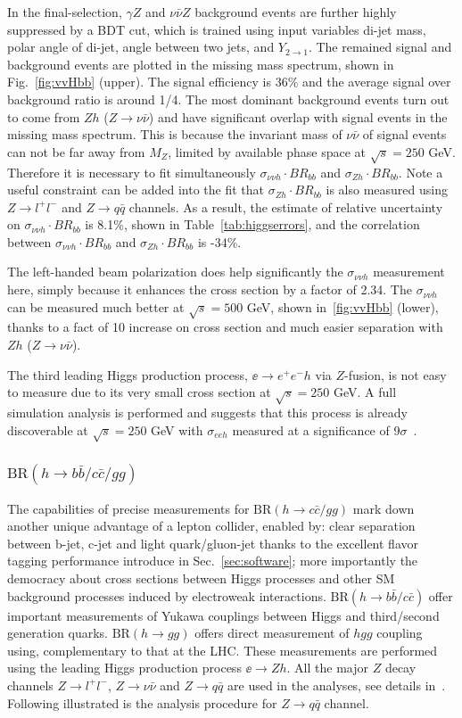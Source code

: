 In the final-selection, $\gamma Z$ and $\nu\bar{\nu}Z$ background 
events are further highly suppressed by a BDT cut, which is trained 
using input variables di-jet mass, polar angle of di-jet, angle between
two jets, and $Y_{2\to1}$. The remained signal and background events
are plotted in the missing mass spectrum, shown in Fig.~\ref{fig:vvHbb} (upper).
The signal efficiency is 36\% and the average signal over background ratio is around 1/4.
The most dominant background events turn out to come from $Zh$ ($Z\to\nu\bar{\nu}$) and 
have significant overlap with signal events in the missing mass spectrum.
This is because the invariant mass of $\nu\bar{\nu}$ of signal events
can not be far away from $M_Z$, limited by available phase space at $\sqrt{s}=250$ GeV.
Therefore it is necessary to fit simultaneously $\sigma_{\nu\nu h}\cdot BR_{bb}$
and $\sigma_{Zh}\cdot BR_{bb}$. Note a useful constraint can be added into the fit
that $\sigma_{Zh}\cdot BR_{bb}$ is also measured 
using $Z\to l^+l^-$ and $Z\to q\bar{q}$ channels. 
As a result, the estimate of relative uncertainty on $\sigma_{\nu\nu h}\cdot BR_{bb}$
is 8.1\%, shown in Table~\ref{tab:higgserrors}, 
and the correlation between $\sigma_{\nu\nu h}\cdot BR_{bb}$ and
$\sigma_{Zh}\cdot BR_{bb}$ is -34\%.

The left-handed beam polarization does help significantly the $\sigma_{\nu\nu h}$
measurement here, simply because it enhances the cross section by a factor of 2.34.
The $\sigma_{\nu\nu h}$ can be measured much better at $\sqrt{s}=500$ GeV, 
shown in~\ref{fig:vvHbb} (lower), thanks
to a fact of 10 increase on cross section and much easier separation with $Zh$ ($Z\to\nu\bar{\nu}$).

The third leading Higgs production process, $\ee\to e^+e^- h$ via $Z$-fusion, is not easy to measure
due to its very small cross section at $\sqrt{s}=250$ GeV. 
A full simulation analysis is performed and 
suggests that this process is already discoverable at $\sqrt{s}=250$ GeV
with $\sigma_{eeh}$ measured at a significance of 9$\sigma$~\cite{}. 

\subsubsection{$\mathrm{BR}(h\to b\bar{b}/c\bar{c}/gg)$}
The capabilities of precise measurements for $\mathrm{BR}(h\to c\bar{c}/gg)$ 
mark down another unique advantage of a lepton collider, enabled by:
clear separation between b-jet, c-jet and light quark/gluon-jet thanks to the
excellent flavor tagging performance introduce in Sec.~\ref{sec:software};
more importantly the democracy about cross sections between Higgs processes and
other SM background processes induced by electroweak interactions.
$\mathrm{BR}(h\to b\bar{b}/c\bar{c})$ offer important measurements of 
Yukawa couplings between Higgs and third/second generation quarks. 
$\mathrm{BR}(h\to gg)$ offers direct measurement of $hgg$ coupling 
using, complementary to that at the LHC. These measurements are performed
using the leading Higgs production process $\ee\to Zh$. All the major $Z$ decay
channels $Z\to l^+l^-$, $Z\to\nu\bar{\nu}$ and $Z\to q\bar{q}$ are used in the analyses,
see details in~\cite{Ono:2013sea}. Following illustrated is the analysis procedure 
for $Z\to q\bar{q}$ channel. 

